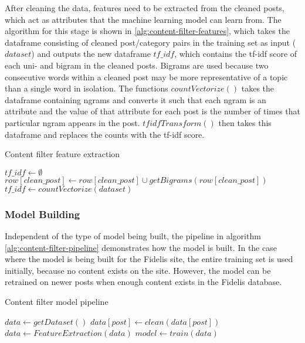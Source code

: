 After cleaning the data, features need to be extracted from the cleaned posts, which act as attributes that the machine learning model can learn from. The algorithm for this stage is shown in \ref{alg:content-filter-features}, which takes the dataframe consisting of cleaned post/category pairs in the training set as input ($dataset$) and outputs the new dataframe $tf\_idf$, which contains the tf-idf score of each uni- and bigram in the cleaned posts. Bigrams are used because two consecutive words within a cleaned post may be more representative of a topic than a single word in isolation. The functions $countVectorize()$ takes the dataframe containing ngrams and converts it such that each ngram is an attribute and the value of that attribute for each post is the number of times that particular ngram appears in the post. $tfidfTransform()$ then takes this dataframe and replaces the counts with the tf-idf score.

\begin{algorithm}
\caption{Content filter feature extraction}
\label{alg:content-filter-features}
\begin{algorithmic}[1]
\State $tf\_idf\gets \emptyset$
	\State $row[clean\_post]\gets row[clean\_post]\cup getBigrams(row[clean\_post])$
\EndFor
\State $tf\_idf\gets countVectorize(dataset)$
\State {}
\EndFunction
\end{algorithmic}
\end{algorithm}

\subsubsection{Model Building}
Independent of the type of model being built, the pipeline in algorithm \ref{alg:content-filter-pipeline} demonstrates how the model is built. In the case where the model is being built for the Fidelis site, the entire training set is used initially, because no content exists on the site. However, the model can be retrained on newer posts when enough content exists in the Fidelis database.

\begin{algorithm}
\caption{Content filter model pipeline}
\label{alg:content-filter-pipeline}
\begin{algorithmic}[1]
\State $data\gets getDataset()$
	\State $data[post]\gets clean(data[post])$
\EndFor
\State $data\gets FeatureExtraction(data)$
\State $model \gets train(data)$
\end{algorithmic}
\end{algorithm}

